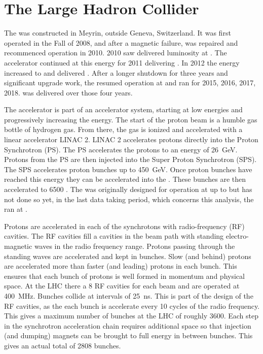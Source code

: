 \section{The Large Hadron Collider}
The \LHC was constructed in Meyrin, outside Geneva, Switzerland.  It was first operated in the Fall of 2008, and after a magnetic failure, was repaired and recommenced operation in 2010.  2010 saw \GLNTEN delivered luminosity at \rootsseven.  The accelerator continued at this energy for 2011 delivering \GLNELEVEN.  In 2012 the energy increased to \rootseight and delivered \GLNTWELVE.  After a longer shutdown for three years and significant upgrade work, the \LHC resumed operation at \rootsthirteen and ran for 2015, 2016, 2017, 2018.  \GLNTOTALII was delivered over those four years.

The \LHC accelerator is part of an accelerator system, starting at low energies and progressively increasing the energy.  The start of the \LHC proton beam is a humble gas bottle of hydrogen gas.  From there, the gas is ionized and accelerated with a linear accelerator LINAC 2.  LINAC 2 accelerates protons directly into the Proton Synchrotron (PS).  The PS accelerates the protons to an energy of \SI{26}{GeV}.  Protons from the PS are then injected into the Super Proton Synchrotron (SPS).  The SPS accelerates proton bunches up to \SI{450}{GeV}.  Once proton bunches have reached this energy they can be accelerated into the \LHC. These bunches are then accelerated to 6500 \GeV.  The \LHC was originally designed for operation at up to \rootsfourteen but has not done so yet, in the last data taking period, which concerns this analysis, the \LHC ran at \rootsthirteen.

Protons are accelerated in each of the synchrotons with radio-frequency (RF) cavities.  The RF cavities fill a cavities in the beam path with standing electro-magnetic waves in the radio frequency range.  Protons passing through the standing waves are accelerated and kept in bunches.  Slow (and behind) protons are accelerated more than faster (and leading) protons in each bunch. This ensures that each bunch of protons is well formed in momentum and physical space.  At the LHC there a 8 RF cavities for each beam and are operated at \SI{400}{MHz}.  Bunches collide at intervals of \SI{25}{ns}.  This is part of the design of the RF cavities, as the each bunch is accelerate every 10 cycles of the radio frequency.  This gives a maximum number of bunches at the LHC of roughly 3600.  Each step in the synchrotron acceleration chain requires additional space so that injection (and dumping) magnets can be brought to full energy in between bunches.  This gives an actual total of 2808 bunches.

